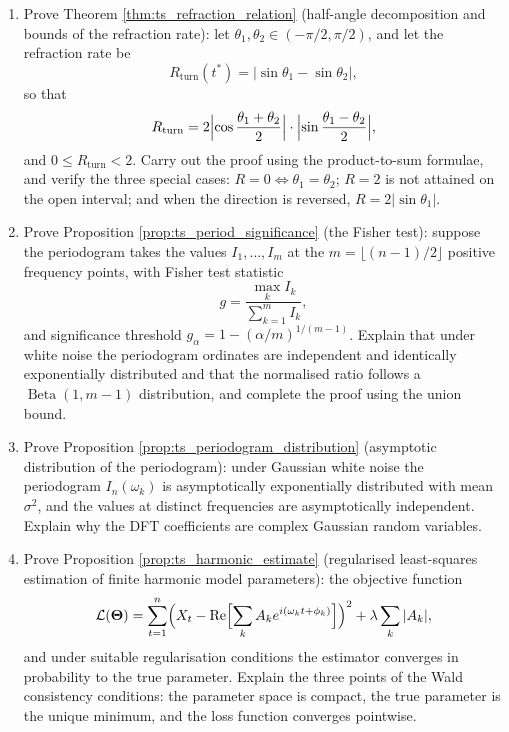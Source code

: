 \begin{enumerate}[leftmargin=3em, label=\textbf{Exercise \arabic*}]
    \item Prove Theorem \ref{thm:ts_refraction_relation} (half-angle decomposition and bounds of the refraction rate):
    let $\theta_1,\theta_2\in(-\pi/2,\pi/2)$, and let the refraction rate be
    \[
    R_{\text{turn}}(t^*)=|\sin\theta_1-\sin\theta_2|,
    \]
    so that
    \[
    R_{\text{turn}}=2\Bigl|\cos\frac{\theta_1+\theta_2}{2}\Bigr|
    \cdot\Bigl|\sin\frac{\theta_1-\theta_2}{2}\Bigr|,
    \]
    and $0\le R_{\text{turn}}<2$.
    Carry out the proof using the product-to-sum formulae,
    and verify the three special cases: $R=0\iff\theta_1=\theta_2$;
    $R=2$ is not attained on the open interval;
    and when the direction is reversed, $R=2|\sin\theta_1|$.

    \item Prove Proposition \ref{prop:ts_period_significance} (the Fisher test):
    suppose the periodogram takes the values $I_1,\dots,I_m$ at the $m=\lfloor(n-1)/2\rfloor$ positive frequency points,
    with Fisher test statistic
    \[
    g=\frac{\max_kI_k}{\sum_{k=1}^mI_k},
    \]
    and significance threshold $g_\alpha=1-(\alpha/m)^{1/(m-1)}$.
    Explain that under white noise the periodogram ordinates are independent and identically exponentially distributed
    and that the normalised ratio follows a $\operatorname{Beta}(1,m-1)$ distribution,
    and complete the proof using the union bound.

    \item Prove Proposition \ref{prop:ts_periodogram_distribution} (asymptotic distribution of the periodogram):
    under Gaussian white noise the periodogram $I_n(\omega_k)$ is asymptotically exponentially distributed with mean $\sigma^2$,
    and the values at distinct frequencies are asymptotically independent.
    Explain why the DFT coefficients are complex Gaussian random variables.

    \item Prove Proposition \ref{prop:ts_harmonic_estimate} (regularised least-squares estimation of finite harmonic model parameters):
    the objective function
    \[
    \mathcal{L}(\boldsymbol{\Theta})=\sum_{t=1}^n
    \Bigl(X_t-\operatorname{Re}\Bigl[\sum_kA_ke^{i(\omega_kt+\phi_k)}\Bigr]\Bigr)^2
    +\lambda\sum_k|A_k|,
    \]
    and under suitable regularisation conditions the estimator converges in probability to the true parameter.
    Explain the three points of the Wald consistency conditions:
    the parameter space is compact, the true parameter is the unique minimum, and the loss function converges pointwise.


\end{enumerate}
